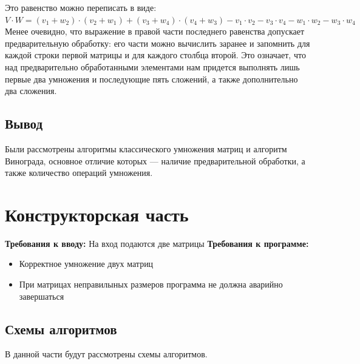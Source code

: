\documentclass[12pt]{report}
\begin{document}
Это равенство можно переписать в виде: \\
$V \cdot W=(v_1 + w_2) \cdot (v_2 + w_1) + (v_3 + w_4) \cdot (v_4 + w_3) - v_1 \cdot v_2 - v_3 \cdot v_4 - w_1 \cdot w_2 - w_3 \cdot w_4$\\

Менее очевидно, что выражение в правой части последнего равенства допускает предварительную обработку: его части можно вычислить заранее и запомнить для каждой строки первой матрицы и для каждого столбца второй. 
Это означает, что над предварительно обработанными элементами нам придется выполнять лишь первые два умножения и последующие пять сложений, а также дополнительно два сложения. 

\section{Вывод}
Были рассмотрены алгоритмы классического умножения матриц и алгоритм Винограда, основное отличие которых — наличие предварительной обработки, а также количество операций умножения.



\chapter{Конструкторская часть}
\textbf{Требования к вводу:}
На вход подаются две матрицы
\newline
\textbf{Требования к программе:}
\begin{itemize}
\item Корректное умножение двух матриц 
\item При матрицах неправилыных размеров программа не должна аварийно завершаться
\end{itemize}

\section{Схемы алгоритмов}
В данной части будут рассмотрены схемы алгоритмов.
\end{document}
